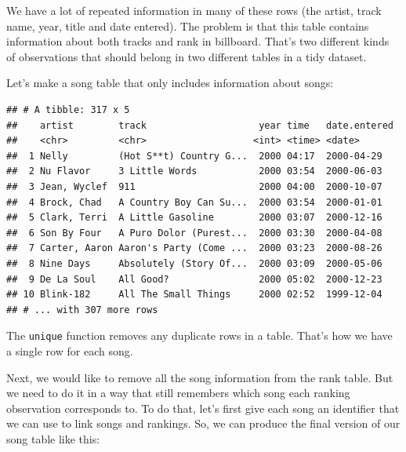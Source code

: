\documentclass[12pt,]{book}
\newenvironment{Shaded}{\begin{snugshade}}{\end{snugshade}}
\newcommand{\KeywordTok}[1]{\textcolor[rgb]{0.13,0.29,0.53}{\textbf{#1}}}
\newcommand{\DataTypeTok}[1]{\textcolor[rgb]{0.13,0.29,0.53}{#1}}
\newcommand{\StringTok}[1]{\textcolor[rgb]{0.31,0.60,0.02}{#1}}
\newcommand{\OperatorTok}[1]{\textcolor[rgb]{0.81,0.36,0.00}{\textbf{#1}}}
\newcommand{\NormalTok}[1]{#1}
\theoremstyle{definition}
\theoremstyle{definition}
\theoremstyle{definition}
\theoremstyle{remark}
\begin{document}
We have a lot of repeated information in many of these rows (the artist,
track name, year, title and date entered). The problem is that this
table contains information about both tracks and rank in billboard.
That's two different kinds of observations that should belong in two
different tables in a tidy dataset.

Let's make a song table that only includes information about songs:

\begin{Shaded}
\end{Shaded}

\begin{verbatim}
## # A tibble: 317 x 5
##    artist        track                    year time   date.entered
##    <chr>         <chr>                   <int> <time> <date>      
##  1 Nelly         (Hot S**t) Country G...  2000 04:17  2000-04-29  
##  2 Nu Flavor     3 Little Words           2000 03:54  2000-06-03  
##  3 Jean, Wyclef  911                      2000 04:00  2000-10-07  
##  4 Brock, Chad   A Country Boy Can Su...  2000 03:54  2000-01-01  
##  5 Clark, Terri  A Little Gasoline        2000 03:07  2000-12-16  
##  6 Son By Four   A Puro Dolor (Purest...  2000 03:30  2000-04-08  
##  7 Carter, Aaron Aaron's Party (Come ...  2000 03:23  2000-08-26  
##  8 Nine Days     Absolutely (Story Of...  2000 03:09  2000-05-06  
##  9 De La Soul    All Good?                2000 05:02  2000-12-23  
## 10 Blink-182     All The Small Things     2000 02:52  1999-12-04  
## # ... with 307 more rows
\end{verbatim}

The \texttt{unique} function removes any duplicate rows in a table.
That's how we have a single row for each song.

Next, we would like to remove all the song information from the rank
table. But we need to do it in a way that still remembers which song
each ranking observation corresponds to. To do that, let's first give
each song an identifier that we can use to link songs and rankings. So,
we can produce the final version of our song table like this:

\begin{Shaded}
\end{Shaded}
\end{document}
